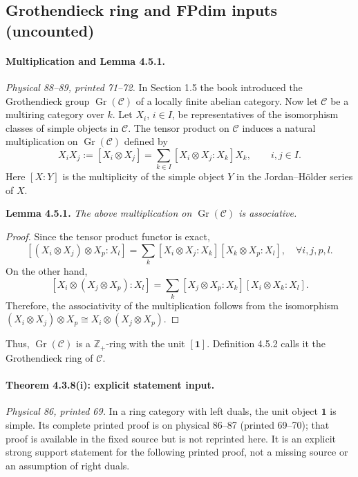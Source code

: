 \documentclass[11pt]{article}
\DeclareMathOperator{\Gr}{Gr}
\newcommand{\Cat}{\mathcal C}
\newcommand{\unit}{\mathbf 1}
\begin{document}
\subsection*{Grothendieck ring and FPdim inputs (uncounted)}
\paragraph{Multiplication and Lemma 4.5.1.}
\emph{Physical 88--89, printed 71--72.}
In Section 1.5 the book introduced the Grothendieck group $\Gr(\Cat)$
of a locally finite abelian category. Now let $\Cat$ be a multiring
category over $k$. Let $X_i$, $i\in I$, be representatives of the
isomorphism classes of simple objects in $\Cat$. The tensor product
on $\Cat$ induces a natural multiplication on $\Gr(\Cat)$ defined by
\begin{equation}
X_iX_j:=[X_i\otimes X_j]
=\sum_{k\in I}[X_i\otimes X_j:X_k]X_k,\qquad i,j\in I.
\tag{4.7}
\end{equation}
Here $[X:Y]$ is the multiplicity of the simple object $Y$ in the
Jordan--H\"older series of $X$.

\noindent\textbf{Lemma 4.5.1.}
\emph{The above multiplication on $\Gr(\Cat)$ is associative.}
\begin{proof}
Since the tensor product functor is exact,
\[
[(X_i\otimes X_j)\otimes X_p:X_l]
=\sum_k[X_i\otimes X_j:X_k][X_k\otimes X_p:X_l],\quad\forall i,j,p,l.
\]
On the other hand,
\[
[X_i\otimes(X_j\otimes X_p):X_l]
=\sum_k[X_j\otimes X_p:X_k][X_i\otimes X_k:X_l].
\]
Therefore, the associativity of the multiplication follows from the
isomorphism $(X_i\otimes X_j)\otimes X_p\cong
X_i\otimes(X_j\otimes X_p)$.
\end{proof}
Thus, $\Gr(\Cat)$ is a $\mathbb Z_+$-ring with the unit $[\unit]$.
Definition 4.5.2 calls it the Grothendieck ring of $\Cat$.

\paragraph{Theorem 4.3.8(i): explicit statement input.}
\emph{Physical 86, printed 69.}
In a ring category with left duals, the unit object $\unit$ is simple.
Its complete printed proof is on physical 86--87 (printed 69--70);
that proof is available in the fixed source but is not reprinted here.
It is an explicit strong support statement for the following printed
proof, not a missing source or an assumption of right duals.
\end{document}
